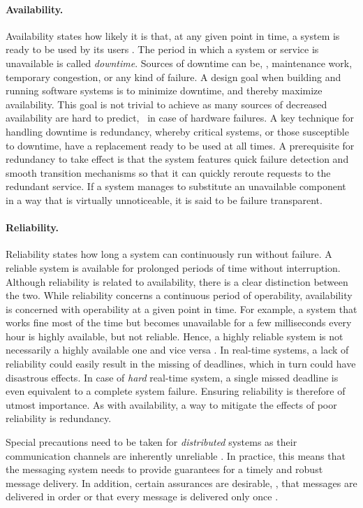 \paragraph{Availability.}
Availability states how likely it is that, at any given point in time, a system is ready to be used by its users \cite{tanenbaum2017distributed}. The period in which a system or service is unavailable is called \emph{downtime}. Sources of downtime can be, \eg , maintenance work, temporary congestion, or any kind of failure. A design goal when building and running software systems is to minimize downtime, and thereby maximize availability. This goal is not trivial to achieve as many sources of decreased availability are hard to predict, \eg\ in case of hardware failures. A key technique for handling downtime is redundancy, whereby critical systems, or those susceptible to downtime, have a replacement ready to be used at all times. A prerequisite for redundancy to take effect is that the system features quick failure detection and smooth transition mechanisms so that it can quickly reroute requests to the redundant service. If a system manages to substitute an unavailable component in a way that is virtually unnoticeable, it is said to be failure transparent.

\paragraph{Reliability.}
Reliability states how long a system can continuously run without failure. A reliable system is available for prolonged periods of time without interruption. Although reliability is related to availability, there is a clear distinction between the two. While reliability concerns a continuous period of operability, availability is concerned with operability at a given point in time. For example, a system that works fine most of the time but becomes unavailable for a few milliseconds every hour is highly available, but not reliable. Hence, a highly reliable system is not necessarily a highly available one and vice versa \cite{tanenbaum2017distributed}. In real-time systems, a lack of reliability could easily result in the missing of deadlines, which in turn could have disastrous effects. In case of \emph{hard} real-time system, a single missed deadline is even equivalent to a complete system failure. Ensuring reliability is therefore of utmost importance. As with availability, a way to mitigate the effects of poor reliability is redundancy.

Special precautions need to be taken for \emph{distributed} systems as their communication channels are inherently unreliable \cite{tanenbaum2017distributed}. In practice, this means that the messaging system needs to provide guarantees for a timely and robust message delivery. In addition, certain assurances are desirable, \eg , that messages are delivered in order or that every message is delivered only once \cite{o2007quality}.

